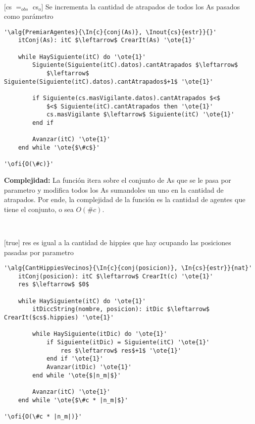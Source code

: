 ~


[cs $=_{obs}$ cs$_o$]
{Se incrementa la cantidad de atrapados de todos los As pasados como parámetro}

\begin{lstlisting}[mathescape]
'\alg{PremiarAgentes}{\In{c}{conj(As)}, \Inout{cs}{estr}}{}'
	itConj(As): itC $\leftarrow$ CrearIt(As) '\ote{1}'

	while HaySiguiente(itC) do '\ote{1}'
		Siguiente(Siguiente(itC).datos).cantAtrapados $\leftarrow$
			$\leftarrow$ Siguiente(Siguiente(itC).datos).cantAtrapados$+1$ '\ote{1}'

		if Siguiente(cs.masVigilante.datos).cantAtrapados $<$
			$<$ Siguiente(itC).cantAtrapados then '\ote{1}'
			cs.masVigilante $\leftarrow$ Siguiente(itC) '\ote{1}'
		end if

		Avanzar(itC) '\ote{1}'
	end while '\ote{$\#c$}'

'\ofi{O(\#c)}'
\end{lstlisting}

\textbf{Complejidad:} La función itera sobre el conjunto de As que se le pasa por parametro y modifica todos los As sumandoles un uno en la cantidad de atrapados. Por ende, la complejidad de la función es la cantidad de agentes que tiene el conjunto, o sea $O(\#c)$.

~


[true]
{res es igual a la cantidad de hippies que hay ocupando las posiciones pasadas por parametro}

\begin{lstlisting}[mathescape]
'\alg{CantHippiesVecinos}{\In{c}{conj(posicion)}, \In{cs}{estr}}{nat}'
	itConj(posicion): itC $\leftarrow$ CrearIt(c) '\ote{1}'
	res $\leftarrow$ $0$

	while HaySiguiente(itC) do '\ote{1}'
		itDiccString(nombre, posicion): itDic $\leftarrow$ CrearIt($cs$.hippies) '\ote{1}'

		while HaySiguiente(itDic) do '\ote{1}'
			if Siguiente(itDic) = Siguiente(itC) '\ote{1}'
				res $\leftarrow$ res$+1$ '\ote{1}'
			end if '\ote{1}'
			Avanzar(itDic) '\ote{1}'
		end while '\ote{$|n_m|$}'

		Avanzar(itC) '\ote{1}'
	end while '\ote{$\#c * |n_m|$}'

'\ofi{O(\#c * |n_m|)}'
\end{lstlisting}


